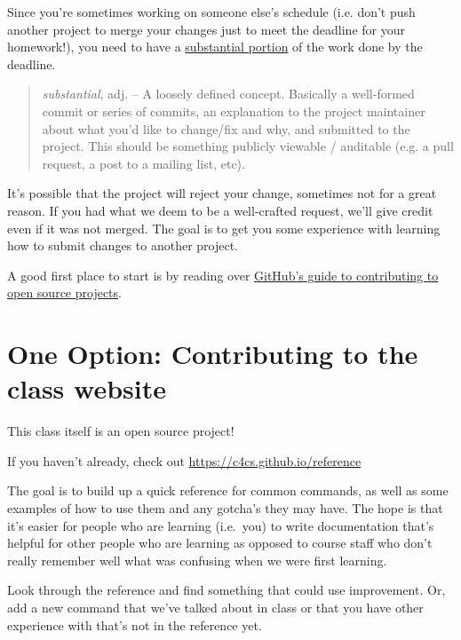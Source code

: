 \documentclass{article}
\begin{document}
Since you're sometimes working on someone else's schedule (i.e. don't push
another project to merge your changes just to meet the deadline for your
homework!), you need to have a \ul{substantial portion} of the work done by
the deadline.

\begin{quote}
  \emph{substantial}, adj. -- A loosely defined concept. Basically a
  well-formed commit or series of commits, an explanation to the project
  maintainer about what you'd like to change/fix and why, and submitted to the
  project. This should be something publicly viewable / auditable (e.g. a
  pull request, a post to a mailing list, etc).
\end{quote}

It's possible that the project will reject your change, sometimes not for a
great reason. If you had what we deem to be a well-crafted request, we'll give
credit even if it was not merged. The goal is to get you some experience with
learning how to submit changes to another project.

\begin{mdframed}\centering
A good first place to start is by reading over
\href{https://guides.github.com/activities/contributing-to-open-source/#contributing}{GitHub's
  guide to contributing to open source projects}.
\end{mdframed}

\newpage

\section*{One Option: Contributing to the class website}

This class itself is an open source project!

If you haven't already, check out \url{https://c4cs.github.io/reference}

The goal is to build up a quick reference for common commands, as well as some
examples of how to use them and any gotcha's they may have. The hope is that
it's easier for people who are learning (i.e.\ you) to write documentation
that's helpful for other people who are learning as opposed to course staff
who don't really remember well what was confusing when we were first learning.

Look through the reference and find something that could use improvement. Or,
add a new command that we've talked about in class or that you have other
experience with that's not in the reference yet.
\end{document}
